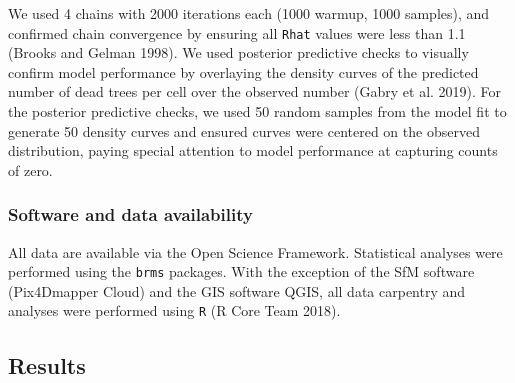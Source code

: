 \documentclass[]{article}
\begin{document}
We used 4 chains with 2000 iterations each (1000 warmup, 1000 samples),
and confirmed chain convergence by ensuring all \texttt{Rhat} values
were less than 1.1 (Brooks and Gelman 1998). We used posterior
predictive checks to visually confirm model performance by overlaying
the density curves of the predicted number of dead trees per cell over
the observed number (Gabry et al. 2019). For the posterior predictive
checks, we used 50 random samples from the model fit to generate 50
density curves and ensured curves were centered on the observed
distribution, paying special attention to model performance at capturing
counts of zero.

\subsubsection{Software and data
availability}\label{software-and-data-availability}

All data are available via the Open Science Framework. Statistical
analyses were performed using the \texttt{brms} packages. With the
exception of the SfM software (Pix4Dmapper Cloud) and the GIS software
QGIS, all data carpentry and analyses were performed using \texttt{R} (R
Core Team 2018).

\subsection{Results}\label{results}
\end{document}
